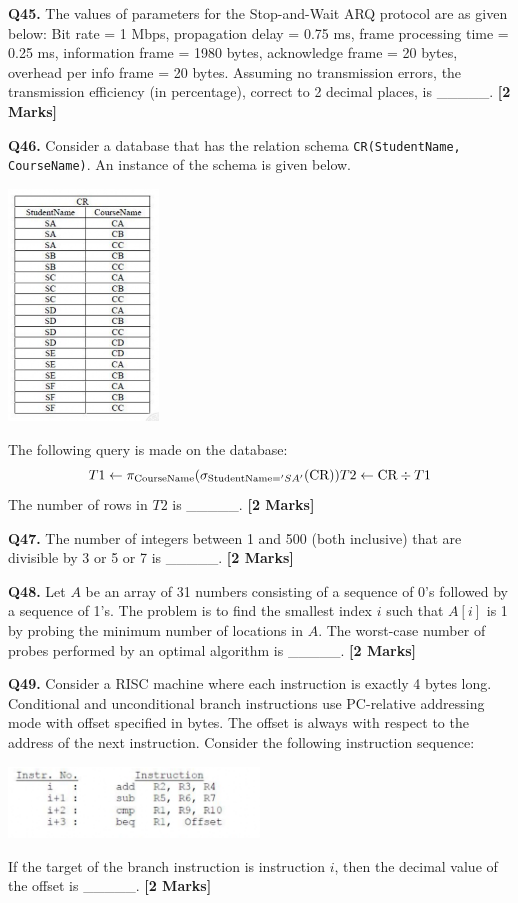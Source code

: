 \documentclass[11pt]{article}
\newcommand{\questionb}[2]{
    \noindent\textbf{Q#2.} #1 \hfill \textbf{[2 Marks]}
}
\begin{document}
\questionb{The values of parameters for the Stop-and-Wait ARQ protocol are as given below:  
Bit rate = 1 Mbps, propagation delay = 0.75 ms, frame processing time = 0.25 ms,  
information frame = 1980 bytes, acknowledge frame = 20 bytes, overhead per info frame = 20 bytes.  
Assuming no transmission errors, the transmission efficiency (in percentage),  
correct to 2 decimal places, is \_\_\_\_\_.}{45}
\vspace{0.5cm}

\questionb{Consider a database that has the relation schema \texttt{CR(StudentName, CourseName)}.  
An instance of the schema is given below.  
\begin{center}
\includegraphics[width=0.3\textwidth]{figures/46.png}
\end{center}
The following query is made on the database:  
\[
T1 \leftarrow \pi_{\text{CourseName}}(\sigma_{\text{StudentName} = 'SA'}(\text{CR})) \\
T2 \leftarrow \text{CR} \div T1
\]  
The number of rows in \( T2 \) is \_\_\_\_\_.}{46}
\vspace{0.5cm}

\questionb{The number of integers between 1 and 500 (both inclusive) that are divisible by 3 or 5 or 7 is \_\_\_\_\_.}{47}
\vspace{0.5cm}

\questionb{Let \( A \) be an array of 31 numbers consisting of a sequence of 0's followed by a sequence of 1's.  
The problem is to find the smallest index \( i \) such that \( A[i] \) is 1 by probing the minimum number of locations in \( A \).  
The worst-case number of probes performed by an optimal algorithm is \_\_\_\_\_.}{48}
\vspace{0.5cm}

\questionb{Consider a RISC machine where each instruction is exactly 4 bytes long.  
Conditional and unconditional branch instructions use PC-relative addressing mode with offset specified in bytes.  
The offset is always with respect to the address of the next instruction.  
Consider the following instruction sequence:  
\begin{center}
\includegraphics[width=0.5\textwidth]{figures/49.png}
\end{center}
If the target of the branch instruction is instruction \( i \), then the decimal value of the offset is \_\_\_\_\_.}{49}
\vspace{0.5cm}
\end{document}
